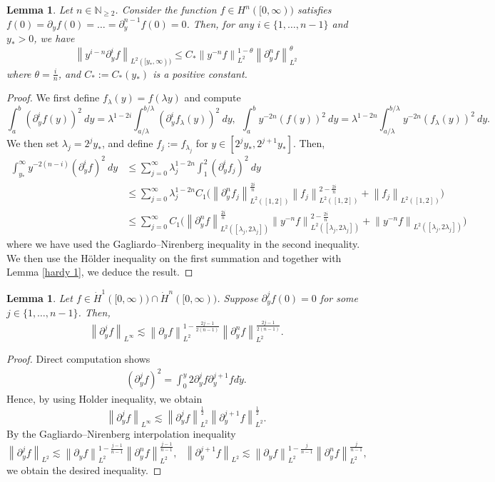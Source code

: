 \documentclass{article}
\newcommand{\norm}[1]{\left\lVert#1\right\rVert}
\newcommand{\pa}{\partial}
\def\be{\begin{equation}}
\def\ee{\end{equation}}
\numberwithin{equation}{section}
\newtheorem{lemma}[theorem]{Lemma}
\begin{document}
\begin{lemma}\label{G-N with weight}
	Let $n\in \mathbb N_{\geq 2}$.  
    Consider the function $f\in H^n([0,\infty))$ satisfies $f(0)=\pa_yf(0)=\dots=\pa_y^{n-1}f(0)=0$. Then, for any $i\in\{1,\dots,n-1\}$ and $y_*>0$, we have
	\be
		\norm{y^{i-n} \pa_y^i f}_{L^2([y_*, \infty))} \leq C_* \norm{y^{-n}f}_{L^2}^{1-\theta} \norm{\pa_y^n f}_{L^2}^{\theta} 
	\ee
	where $\theta=\frac{i}{n}$, and $C_*:=C_*(y_*)$ is a positive constant. 
\end{lemma}
\begin{proof}
	We first define $f_\lambda(y) = f(\lambda y)$ and compute 
	\[
		\int_{a}^{b} (\pa_y^i f(y))^2 \ dy = \lambda^{1-2i}\int_{ a/\lambda}^{b/\lambda} (\pa_y^i f_\lambda(y))^2 \ dy, \ \ \int_{a}^{b} y^{-2n} (f(y))^2 \ dy = \lambda^{1-2n}\int_{ a/\lambda}^{b/\lambda} y^{-2n} (f_\lambda(y))^2 \ dy.
	\] 
	 We then set $\lambda_j =  2^j y_*$, and define $f_j:=f_{\lambda_j}$ for $y\in[2^jy_*, 2^{j+1}y_*]$. Then, 
	 \begin{align*}
	 	\int_{y_*}^\infty y^{-2(n-i)} (\pa_y^i f)^2 \ dy 
        &\leq \sum_{j=0}^\infty \lambda_j^{1-2n}  \int_{1 }^{2}    (\pa_y^i f_j)^2 \ dy \\
		&\leq  \sum_{j=0}^\infty  \lambda_j^{1-2n}C_1 \Big( \norm{\pa_y^n f_j}_{L^2([1,2])}^{\frac{2i}{n}}\norm{f_j}_{L^2([1,2])}^{2-\frac{2i}{n}}+\norm{f_j}_{L^2([1,2])} \Big)\\
        &\leq \sum_{j=0}^\infty C_1  \Big(  \norm{\pa_y^n f}_{L^2([\lambda_j,2\lambda_j])}^{\frac{2i}{n}}\norm{ y^{-n}f}_{L^2([\lambda_j,2\lambda_j])}^{2-\frac{2i}{n}}+ \norm{ y^{-n}f}_{L^2([\lambda_j,2\lambda_j])}\Big) 
	 \end{align*}
     where we have used the Gagliardo–Nirenberg inequality in the second inequality.
     We then use the H\"{o}lder inequality on the first summation and together with Lemma \ref{hardy 1}, we deduce the result.   
\end{proof}


\begin{lemma}\label{Linfty decay}
	Let $f \in\dot H^1([0,\infty)) \cap \dot H^n([0,\infty))$. Suppose $\pa_y ^j f(0) =0$ for some $j\in\{1,\dots, n-1\}$. Then, 
	\be
		\norm{\pa_y^j f}_{L^\infty} \lesssim \norm{\pa_y f}_{L^2}^{1-\frac{2j-1}{2(n-1)}} \norm{\pa_y^n f}_{L^2}^{\frac{2j-1}{2(n-1)}}. 
	\ee
\end{lemma}
\begin{proof}
	Direct computation shows
    \begin{align*}
        (\pa_y^j f)^2 = \int_0^y 2\pa_y^j f \pa_y^{j+1} f d\tilde y.
    \end{align*}
    Hence, by using Holder inequality, we obtain
    \[
        \norm{\pa_y^j f}_{L^\infty} \lesssim \norm{\pa_y^j f}_{L^2}^{\frac{1}{2}}\norm{\pa_y^{j+1}f}_{L^2}^{\frac{1}{2}}.
    \]
    By the Gagliardo–Nirenberg interpolation inequality
    \[
        \norm{\pa_y^jf}_{L^2} \lesssim \norm{\pa_y f}_{L^2}^{1-\frac{j-1}{n-1}} \norm{\pa_y^n f}_{L^2}^{\frac{j-1}{n-1}}, \ \ \ 
        \norm{\pa_y^{j+1}f}_{L^2} \lesssim \norm{\pa_y f}_{L^2}^{1-\frac{j}{n-1}} \norm{\pa_y^n f}_{L^2}^{\frac{j}{n-1}}, 
    \]
    we obtain the desired inequality. 
\end{proof}
\end{document}
